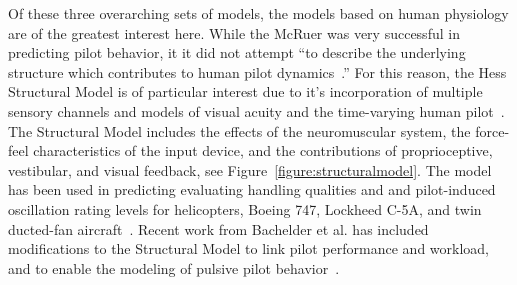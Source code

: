 \documentclass[float=false, crop=false]{standalone}
\begin{document}
Of these three overarching sets of models, the models based on human physiology are of the greatest interest here.
While the McRuer was very successful in predicting pilot behavior, it it did not attempt ``to describe the underlying structure which contributes to human pilot dynamics~\cite{Hess1980}.''
For this reason, the Hess Structural Model is of particular interest due to it's incorporation of multiple sensory channels and models of visual acuity and the time-varying human pilot~\cite{Hess2009}.
The Structural Model includes the effects of the neuromuscular system, the force-feel characteristics of the input device, and the contributions of proprioceptive, vestibular, and visual feedback, see Figure~\ref{figure:structuralmodel}.
The model has been used in predicting evaluating handling qualities and and pilot-induced oscillation rating levels for helicopters, Boeing 747, Lockheed C-5A, and twin ducted-fan aircraft~\cite{Hess2013, Andreea-Irina2014, Grant2015}.
Recent work from Bachelder et al. has included modifications to the Structural Model to link pilot performance and workload, and to enable the modeling of pulsive pilot behavior~\cite{Bachelder2017, Bachelder2018}.
\end{document}
